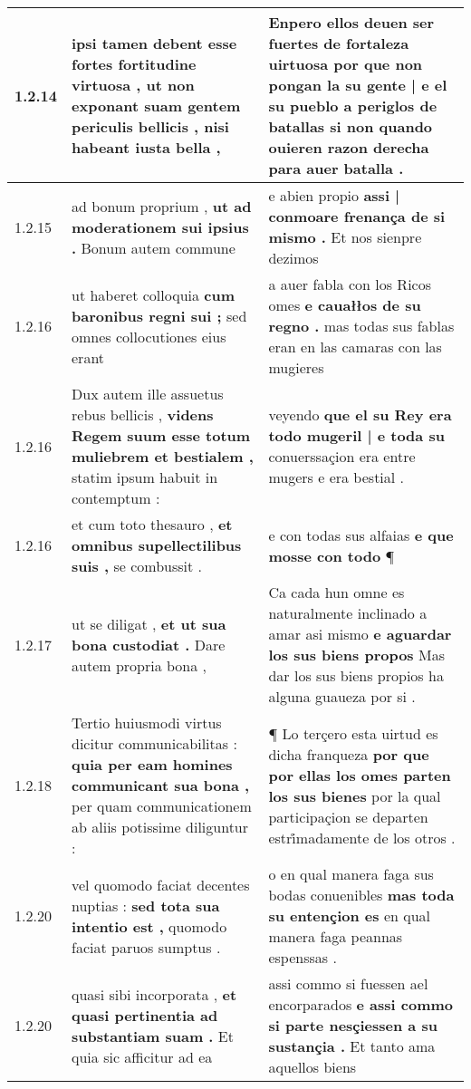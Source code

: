 \begin{tabular}{|p{1cm}|p{6.5cm}|p{6.5cm}|}
1.2.14 & ipsi tamen debent esse fortes fortitudine virtuosa , \textbf{ ut non exponant suam gentem periculis bellicis , } nisi habeant iusta bella , & Enpero ellos deuen ser fuertes de fortaleza uirtuosa \textbf{ por que non pongan la su gente | e el su pueblo a periglos de batallas } si non quando ouieren razon derecha para auer batalla . \\\hline
1.2.15 & ad bonum proprium , \textbf{ ut ad moderationem sui ipsius . } Bonum autem commune & e abien propio \textbf{ assi | conmoare frenança de si mismo . } Et nos sienpre dezimos \\\hline
1.2.16 & ut haberet colloquia \textbf{ cum baronibus regni sui ; } sed omnes collocutiones eius erant & a auer fabla con los Ricos omes \textbf{ e cauałłos de su regno . } mas todas sus fablas eran en las camaras con las mugieres \\\hline
1.2.16 & Dux autem ille assuetus rebus bellicis , \textbf{ videns Regem suum esse totum muliebrem et bestialem , } statim ipsum habuit in contemptum : & veyendo \textbf{ que el su Rey era todo mugeril | e toda su } conuerssaçion era entre mugers e era bestial . \\\hline
1.2.16 & et cum toto thesauro , \textbf{ et omnibus supellectilibus suis , } se combussit . & e con todas sus alfaias \textbf{ e que mosse con todo } ¶ \\\hline
1.2.17 & ut se diligat , \textbf{ et ut sua bona custodiat . } Dare autem propria bona , & Ca cada hun omne es naturalmente inclinado a amar asi mismo \textbf{ e aguardar los sus biens propos } Mas dar los sus biens propios ha alguna guaueza por si . \\\hline
1.2.18 & Tertio huiusmodi virtus dicitur communicabilitas : \textbf{ quia per eam homines communicant sua bona , } per quam communicationem ab aliis potissime diliguntur : & ¶ Lo terçero esta uirtud es dicha franqueza \textbf{ por que por ellas los omes parten los sus bienes } por la qual participaçion se departen estri̊madamente de los otros . \\\hline
1.2.20 & vel quomodo faciat decentes nuptias : \textbf{ sed tota sua intentio est , } quomodo faciat paruos sumptus . & o en qual manera faga sus bodas conuenibles \textbf{ mas toda su entençion es } en qual manera faga peannas espenssas . \\\hline
1.2.20 & quasi sibi incorporata , \textbf{ et quasi pertinentia ad substantiam suam . } Et quia sic afficitur ad ea & assi commo si fuessen ael encorparados \textbf{ e assi commo si parte nesçiessen a su sustançia . } Et tanto ama aquellos biens \\\hline

\end{tabular}
